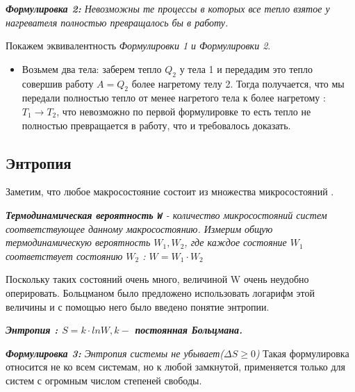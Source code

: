 \documentclass[../main.tex]{subfiles}
\begin{document}
\vspace{5px}

\textit{\textbf{Формулировка 2:} Невозможны те процессы в которых все тепло взятое у нагревателя полностью превращалось бы в работу.}

\vspace{5px}

Покажем эквивалентность\textit{ Формулировки 1 и Формулировки 2}.

\vspace{4px}
\begin{itemize}
    \item Возьмем два тела: заберем тепло $Q_2$ у тела 1 и передадим это тепло совершив работу $A = Q_2$ более нагретому телу 2. Тогда получается, что мы передали полностью тепло от менее нагретого тела к более нагретому : $T_1 \to T_2$, что невозможно по первой формулировке то есть тепло не полностью превращается в работу, что и требовалось доказать.
\end{itemize}
\subsection{Энтропия}
Заметим, что любое макросостояние состоит из множества микросостояний .

\vspace{4px}

 \textit{\textbf{Термодинамическая вероятность \texttt{W}} - количество микросостояний систем соответствующее данному макросостоянию. Измерим общую термодинамическую вероятность $W_1, W_2$, где каждое состояние $W_1$ соответствует состоянию $W_2$ : $W = W_1 \cdot W_2$}

\vspace{4px}

Поскольку таких состояний очень много, величиной W очень неудобно оперировать. Больцманом было предложено использовать логарифм этой величины и с помощью него было введено понятие энтропии.

\vspace{5px}

\textit{\textbf{Энтропия : $S = k \cdot ln{W}, k - $ постоянная Больцмана.}}

\vspace{5px}

\textit{\textbf{Формулировка 3: }Энтропия системы не убывает($\Delta S \geq  0 $)}
Такая формулировка относится не ко всем системам, но к любой замкнутой, применяется только для систем с огромным числом степеней свободы.
\end{document}
